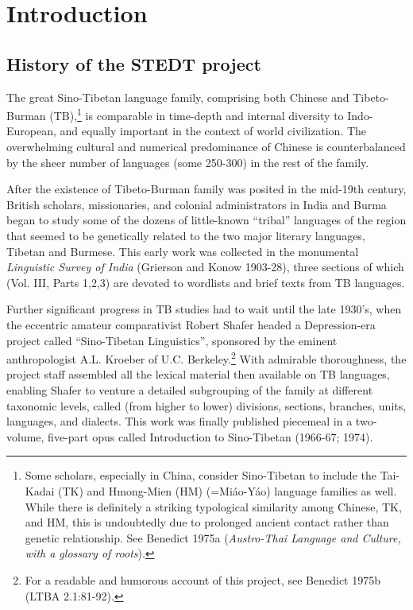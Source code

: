 \vspace{0.25em}


\renewcommand{\thefootnote}{\arabic{footnote}}
\setcounter{footnote}{0}

\chapter*{Introduction}

\section{History of the STEDT project}

The great Sino-Tibetan language family, comprising both Chinese and Tibeto-Burman (TB),\footnote{Some scholars, especially in China,
consider Sino-Tibetan to include the
Tai-Kadai (TK) and Hmong-Mien (HM) (=Mi\'ao-Y\'ao) language families as well.  While
there is definitely a striking typological similarity among Chinese, TK, and HM,
this is undoubtedly due to prolonged ancient contact rather than genetic
relationship.  See Benedict 1975a (\textit{Austro-Thai Language and Culture, with a
glossary of roots}).} is comparable in time-depth and internal diversity to Indo-European, and equally important in the context of world civilization. The overwhelming cultural and numerical predominance of Chinese is counterbalanced by the sheer number of languages (some 250-300) in the rest of the family.

After the existence of Tibeto-Burman family was posited in the mid-19th century, British scholars, missionaries, and colonial administrators in India and Burma began to study some of the dozens of little-known “tribal” languages of the region that seemed to be genetically related to the two major literary languages, Tibetan and Burmese. This early work was collected in the monumental \textit{Linguistic Survey of India} (Grierson and Konow 1903-28), three sections of which (Vol. III, Parts 1,2,3) are devoted to wordlists and brief texts from TB languages.

Further significant progress in TB studies had to wait until the late 1930's, when the eccentric amateur comparativist Robert Shafer headed a Depression-era project called “Sino-Tibetan Linguistics”, sponsored by the eminent anthropologist A.L. Kroeber of U.C. Berkeley.\footnote{For a readable and humorous account of this project, see Benedict 1975b (LTBA 2.1:81-92).} With admirable thoroughness, the project staff assembled all the lexical material then available on TB languages, enabling Shafer to venture a detailed subgrouping of the family at different taxonomic levels, called (from higher to lower) divisions, sections, branches, units, languages, and dialects. This work was finally published piecemeal in a two-volume, five-part opus called Introduction to Sino-Tibetan (1966-67; 1974).

